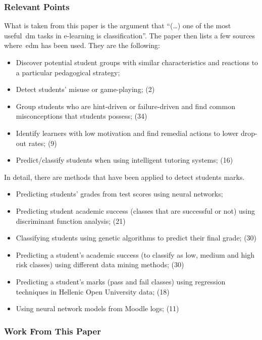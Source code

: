 \subsubsection{Relevant Points}

What is taken from this paper is the argument that ``(\dots) one of the most
useful~\gls{dm} tasks in e-learning is classification''. The paper then lists a
few sources where~\gls{edm} has been used. They are the following:

\begin{itemize}
    \item Discover potential student groups with similar characteristics and
        reactions to a particular pedagogical strategy;~\cite{ind_002}
    \item Detect students' misuse or game-playing; (2)
    \item Group students who are hint-driven or failure-driven and find common
        misconceptions that students possess; (34)
    \item Identify learners with low motivation and find remedial actions to
        lower drop-out rates; (9)
    \item Predict/classify students when using intelligent tutoring systems;
        (16)
\end{itemize}

In detail, there are methods that have been applied to detect students marks.

\begin{itemize}
    \item Predicting students' grades from test scores using neural
        networks;~\cite{ind_003}
    \item Predicting student academic success (classes that are successful or
        not) using discriminant function analysis; (21)
    \item Classifying students using genetic algorithms to predict their final
        grade; (30)
    \item Predicting a student's academic success (to classify as low, medium
        and high risk classes) using different data mining methods; (30)
    \item Predicting a student’s marks (pass and fail classes) using regression
        techniques in Hellenic Open University data; (18)
    \item Using neural network models from Moodle logs; (11)
\end{itemize}

\subsubsection{Work From This Paper}

